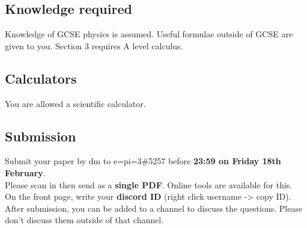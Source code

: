 \documentclass{exam}
\begin{document}
\subsection*{Knowledge required}
Knowledge of GCSE physics is assumed. Useful formulae outside of GCSE are given to you. Section 3 requires A level calculus.

\subsection*{Calculators}
You are allowed a scientific calculator.

\subsection*{Submission}
Submit your paper by dm to
{\selectfont e=pi=3\#5257}
before \textbf{23:59 on Friday 18th February}.\\
Please scan in then send as a \textbf{single PDF}. Online tools are available for this.\\
On the front page, write your \textbf{discord ID} (right click username -> copy ID).\\
After submission, you can be added to a channel to discuss the questions. Please don't discuss them outside of that channel.

\centering

\end{document}

